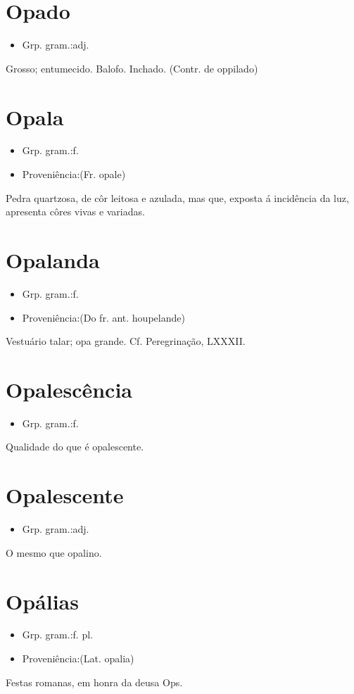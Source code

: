 \section{Opado}
\begin{itemize}
\item {Grp. gram.:adj.}
\end{itemize}
Grosso; entumecido.
Balofo.
Inchado.
(Contr. de \textunderscore oppilado\textunderscore )
\section{Opala}
\begin{itemize}
\item {Grp. gram.:f.}
\end{itemize}
\begin{itemize}
\item {Proveniência:(Fr. \textunderscore opale\textunderscore )}
\end{itemize}
Pedra quartzosa, de côr leitosa e azulada, mas que, exposta á incidência da luz, apresenta côres vivas e variadas.
\section{Opalanda}
\begin{itemize}
\item {Grp. gram.:f.}
\end{itemize}
\begin{itemize}
\item {Proveniência:(Do fr. ant. \textunderscore houpelande\textunderscore )}
\end{itemize}
Vestuário talar; opa grande. Cf. \textunderscore Peregrinação\textunderscore , LXXXII.
\section{Opalescência}
\begin{itemize}
\item {Grp. gram.:f.}
\end{itemize}
Qualidade do que é opalescente.
\section{Opalescente}
\begin{itemize}
\item {Grp. gram.:adj.}
\end{itemize}
O mesmo que \textunderscore opalino\textunderscore .
\section{Opálias}
\begin{itemize}
\item {Grp. gram.:f. pl.}
\end{itemize}
\begin{itemize}
\item {Proveniência:(Lat. \textunderscore opalia\textunderscore )}
\end{itemize}
Festas romanas, em honra da deusa Ops.
